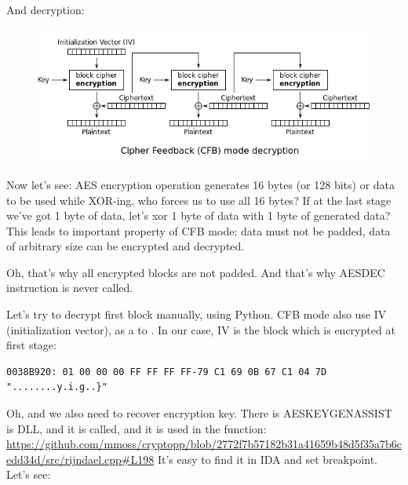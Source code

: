 And decryption:

\begin{figure}[H]
\centering
\includegraphics[scale=\FigScale]{examples/encrypted_DB1/601px-CFB_decryption.svg.png}
\label{fig:CFB_decryption}
\end{figure}

Now let's see: AES encryption operation generates 16 bytes (or 128 bits) or  data
to be used while XOR-ing, who forces us to use all 16 bytes?
If at the last stage we've got 1 byte of data, let's xor 1 byte of data with 1 byte of generated
 data?
This leads to important property of CFB mode: data must not be padded, data of arbitrary size
can be encrypted and decrypted.

Oh, that's why all encrypted blocks are not padded.
And that's why AESDEC instruction is never called.

Let's try to decrypt first block manually, using Python.
CFB mode also use IV (initialization vector), as a  to .
In our case, IV is the block which is encrypted at first stage:

\begin{lstlisting}
0038B920: 01 00 00 00 FF FF FF FF-79 C1 69 0B 67 C1 04 7D "........y.i.g..}"
\end{lstlisting}

Oh, and we also need to recover encryption key.
There is AESKEYGENASSIST is DLL, and it is called, and it is used in the 
 function:
\url{https://github.com/mmoss/cryptopp/blob/2772f7b57182b31a41659b48d5f35a7b6cedd34d/src/rijndael.cpp#L198}
It's easy to find it in IDA and set breakpoint. Let's see:

